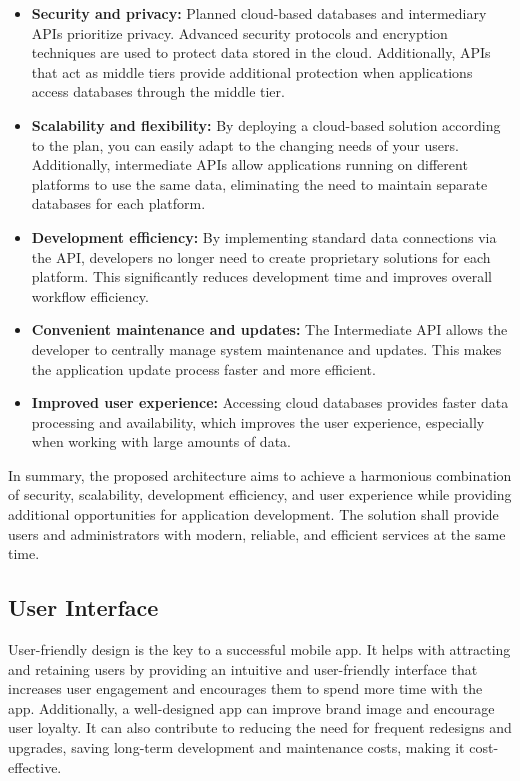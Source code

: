 \begin{itemize}
	\item \textbf{Security and privacy:} Planned cloud-based databases and intermediary APIs prioritize privacy. Advanced security protocols and encryption techniques are used to protect data stored in the cloud. Additionally, APIs that act as middle tiers provide additional protection when applications access databases through the middle tier.
	
	\item \textbf{Scalability and flexibility:} By deploying a cloud-based solution according to the  plan, you can easily adapt to the changing needs of your users.
	Additionally,  intermediate APIs allow applications running on different platforms to use the same data, eliminating the need to maintain separate databases for each platform.
	
	\item \textbf{Development efficiency:} By implementing standard data connections via the  API,  developers no longer need to create proprietary solutions for each platform.
	This significantly reduces development time and improves overall workflow efficiency.
	
	\item \textbf{Convenient maintenance and updates:} The Intermediate API allows the developer to centrally manage system maintenance and updates. This makes the application update process faster and more efficient.
	
	\item \textbf{Improved user experience:} Accessing cloud databases provides faster data processing and availability, which improves the user experience, especially when working with large amounts of data.
\end{itemize}
 
In summary, the proposed architecture aims to achieve a harmonious combination of security, scalability, development efficiency, and user experience while providing additional opportunities for application development. The solution shall provide users and administrators with modern, reliable, and efficient services at the same time.

\subsection{User Interface}

User-friendly design is the key to a successful mobile app. It helps with attracting and retaining users by providing an intuitive and user-friendly interface that increases user engagement and encourages them to spend more time with the app. Additionally, a well-designed app can improve brand image and encourage user loyalty. It can also contribute to reducing the need for frequent redesigns and upgrades, saving long-term development and maintenance costs, making it cost-effective. 

